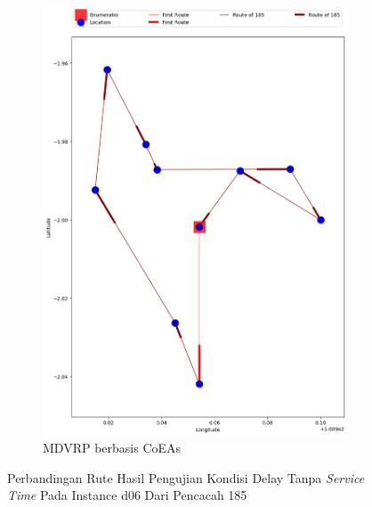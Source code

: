\begin{figure}[H]
	\centering
	\begin{subfigure}[t]{\textwidth}
		\centering
		\includegraphics[width=\textwidth]{Resources/Images/delayed_6/real_m15_n100_delayed_6_185_coes}
		\caption{MDVRP berbasis CoEAs}
		\label{fig:real_m15_n100_delayed_6_185_coes}
	\end{subfigure}
	\caption{Perbandingan Rute Hasil Pengujian Kondisi Delay Tanpa \textit{Service Time} Pada Instance d06 Dari Pencacah 185}
	\label{fig:real_m15_n100_delayed_6_185}
\end{figure}


